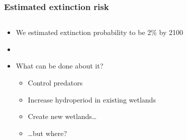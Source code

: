 \documentclass[color=usenames,dvipsnames]{beamer}
\begin{document}
\begin{frame}
  \frametitle{Estimated extinction risk}
  \begin{columns}
    \begin{column}{0.6\textwidth}
      \begin{itemize}%
      \item<1-> We estimated extinction probability to be 2\% by 2100
      \item[]
      \item<2-> What can be done about it?
        \begin{itemize}
        \item<3-> Control predators
        \item<4-> Increase hydroperiod in existing wetlands
        \item<5-> Create new wetlands\dots
        \item<6-> \dots but where?
        \end{itemize}
      \end{itemize}
    \end{column}
    \begin{column}{0.4\textwidth}
      \begin{center}

\end{center}
\end{column}
\end{columns}
\end{frame}
\end{document}
